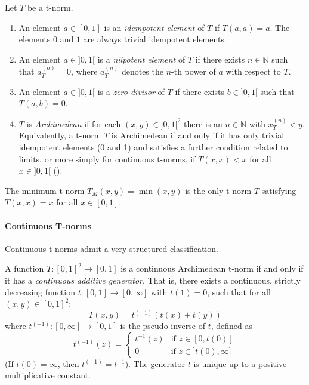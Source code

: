 \begin{definition}
Let $T$ be a t-norm.
\begin{enumerate}
    \item An element $a \in [0,1]$ is an \emph{idempotent element} of $T$ if $T(a,a)=a$. The elements $0$ and $1$ are always trivial idempotent elements.
    \item An element $a \in ]0,1[$ is a \emph{nilpotent element} of $T$ if there exists $n \in \mathbb{N}$ such that $a_T^{(n)} = 0$, where $a_T^{(n)}$ denotes the $n$-th power of $a$ with respect to $T$.
    \item An element $a \in ]0,1[$ is a \emph{zero divisor} of $T$ if there exists $b \in ]0,1[$ such that $T(a,b)=0$.
    \item $T$ is \emph{Archimedean} if for each $(x,y) \in ]0,1[^2$ there is an $n \in \mathbb{N}$ with $x_T^{(n)} < y$. Equivalently, a t-norm $T$ is Archimedean if and only if it has only trivial idempotent elements (0 and 1) and satisfies a further condition related to limits, or more simply for continuous t-norms, if $T(x,x) < x$ for all $x \in ]0,1[$ (\citep[Theorem 2.12 and Theorem 5.1]{Klement2000}).
\end{enumerate}
\end{definition}

\begin{proposition}
  The minimum t-norm $T_M(x,y) = \min(x,y)$ is the only t-norm $T$ satisfying $T(x,x)=x$ for all $x \in [0,1]$.
\end{proposition}

\paragraph{Continuous T-norms}
Continuous t-norms admit a very structured classification.

\begin{theorem}
  A function $T: [0,1]^2 \to [0,1]$ is a continuous Archimedean t-norm if and only if it has a \emph{continuous additive generator}. That is, there exists a continuous, strictly decreasing function $t: [0,1] \to [0,\infty]$ with $t(1)=0$, such that for all $(x,y) \in [0,1]^2$:
  \[
  T(x,y) = t^{(-1)}(t(x) + t(y))
  \]
  where $t^{(-1)}: [0,\infty] \to [0,1]$ is the pseudo-inverse of $t$, defined as
  \[
  t^{(-1)}(z) =
  \begin{cases}
    t^{-1}(z) & \text{if } z \in [0, t(0)] \\
    0 & \text{if } z \in ]t(0), \infty]
  \end{cases}
  \]
  (If $t(0)=\infty$, then $t^{(-1)} = t^{-1}$). The generator $t$ is unique up to a positive multiplicative constant.
\end{theorem}

